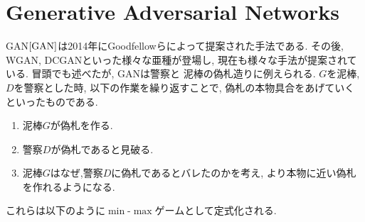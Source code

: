 \section{Generative Adversarial Networks}
GAN$\cite{GAN}$は2014年にGoodfellowらによって提案された手法である. 
その後, WGAN, DCGANといった様々な亜種が登場し, 現在も様々な手法が提案されている.
冒頭でも述べたが, GANは警察と
泥棒の偽札造りに例えられる. $G$を泥棒, $D$を警察とした時, 以下の作業を繰り返すことで, 偽札の本物具合をあげていくといったものである.
\begin{enumerate}
    \item 泥棒$G$が偽札を作る.
    \item 警察$D$が偽札であると見破る.
    \item 泥棒$G$はなぜ,警察$D$に偽札であるとバレたのかを考え, より本物に近い偽札を作れるようになる.
\end{enumerate}
これらは以下のように$\min$-$\max$ゲームとして定式化される.
